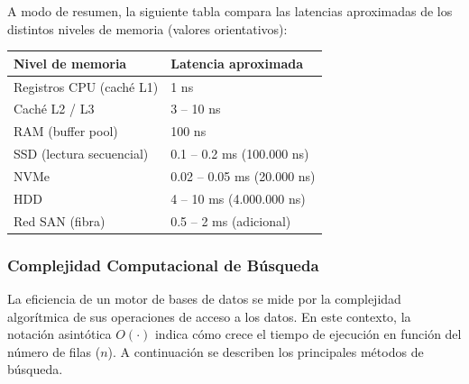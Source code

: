 \documentclass[12pt,a4paper,openany,oneside]{book}
\begin{document}
A modo de resumen, la siguiente tabla compara las latencias aproximadas de los distintos niveles de memoria (valores orientativos):

\begin{center}
\begin{tabular}{|l|l|}
\hline
\textbf{Nivel de memoria} & \textbf{Latencia aproximada} \\ \hline
Registros CPU (caché L1)  & 1 ns                        \\
Caché L2 / L3             & 3 -- 10 ns                  \\
RAM (buffer pool)         & 100 ns                      \\
SSD (lectura secuencial)  & 0.1 -- 0.2 ms (100.000 ns)  \\
NVMe                      & 0.02 -- 0.05 ms (20.000 ns) \\
HDD                       & 4 -- 10 ms (4.000.000 ns)   \\
Red SAN (fibra)           & 0.5 -- 2 ms (adicional)     \\ \hline
\end{tabular}
\end{center}

\subsubsection{Complejidad Computacional de Búsqueda}

La eficiencia de un motor de bases de datos se mide por la complejidad algorítmica de sus operaciones de acceso a los datos. En este contexto, la notación asintótica $O(\cdot)$ indica cómo crece el tiempo de ejecución en función del número de filas ($n$). A continuación se describen los principales métodos de búsqueda.
\end{document}
